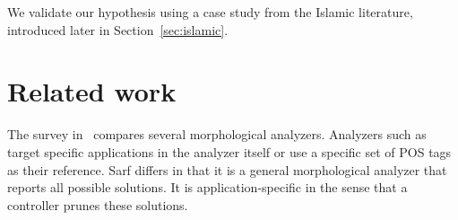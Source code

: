 \documentclass[11pt]{article}
\begin{document}
We validate our hypothesis using a case study from the Islamic 
literature, introduced later in Section~\ref{sec:islamic}.




\section{Related work }
\label{sec:related}

The survey in~\cite{Sughaiyer:04} compares
several morphological analyzers. 
Analyzers such as~\cite{Khoja:01,Darwish:02} 
target specific applications in the 
analyzer itself or use a specific set of POS tags
as their reference.
Sarf differs in that it is a general morphological 
analyzer that reports all possible solutions. 
It is application-specific in the sense that a controller 
prunes these solutions. 
\end{document}
